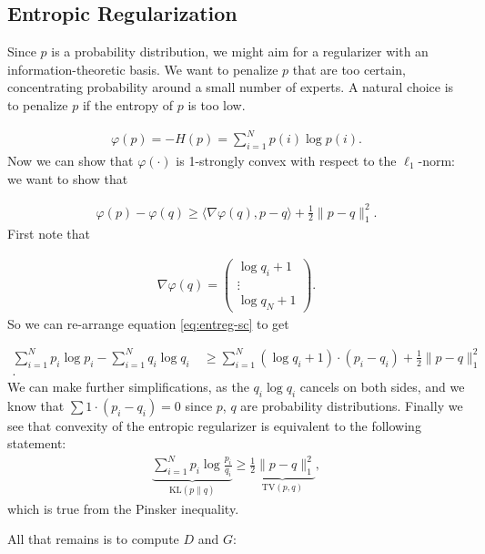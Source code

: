 \documentclass[11pt]{article}
\begin{document}
\subsection{Entropic Regularization}
Since \(p\) is a probability distribution, we might aim for a regularizer with an information-theoretic basis. We want to penalize $p$ that are too certain, concentrating probability around a small number of experts. A natural choice is to penalize $p$ if the entropy of $p$ is too low.

\begin{align}
    \varphi(p) = -H(p) = \sum_{i=1}^Np(i)\log p(i).
\end{align}
Now we can show that \(\varphi(\cdot)\) is 1-strongly convex with respect to the \(\ell_1\)-norm: we want to show that 

\begin{align}
    \varphi(p) - \varphi(q) \geq \langle \nabla \varphi(q), p-q\rangle + \tfrac{1}{2}\|p-q\|^2_1.
    \label{eq:entreg-sc}
\end{align}
First note that

\begin{align}
    \nabla \varphi(q) = \begin{pmatrix} \log q_i + 1 \\ \vdots \\ \log q_N + 1 \end{pmatrix}.
\end{align}
So we can re-arrange equation \ref{eq:entreg-sc} to get

\begin{equation}
\begin{split}
    \sum_{i=1}^Np_i\log p_i - \sum_{i=1}^Nq_i\log q_i & \ \geq \sum_{i=1}^N(\log q_i + 1)\cdot(p_i - q_i) + \tfrac{1}{2}\|p-q\|_1^2 \\.
\end{split}
\end{equation}
We can make further simplifications, as the \(q_i\log q_i\) cancels on both sides, and we know that \(\sum 1\cdot(p_i - q_i) = 0\) since \(p\), \(q\) are probability distributions. Finally we see that convexity of the entropic regularizer is equivalent to the following statement:
\begin{align}
    \underbrace{\sum_{i=1}^Np_i\log \frac{p_i}{q_i}}_{\mathrm{KL}(p\|q)} \geq \underbrace{\tfrac{1}{2}\|p - q\|_1^2}_{\mathrm{TV}(p,q)},
\end{align}
which is true from the Pinsker inequality.

All that remains is to compute \(D\) and \(G\):
\end{document}
